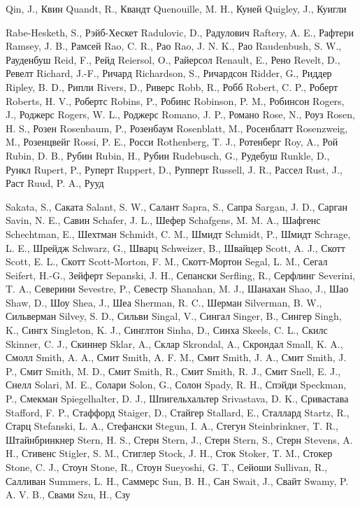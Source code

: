 Qin, J., Квин
Quandt, R., Квандт
Quenouille, M. H., Куней 
Quigley, J., Куигли

Rabe-Hesketh, S., Рэйб-Хескет
Radulovic, D., Радулович
Raftery, A. E., Рафтери
Ramsey, J. B., Рамсей
Rao, C. R., Рао
Rao, J. N. K., Рао
Raudenbush, S. W., Рауденбуш 
Reid, F., Рейд
Reiersol, O., Райерсол
Renault, E., Рено 
Revelt, D., Ревелт
Richard, J.-F., Ричард 
Richardson, S., Ричардсон 
Ridder, G., Риддер 
Ripley, B. D., Рипли 
Rivers, D., Риверс
Robb, R., Робб
Robert, C. P., Роберт
Roberts, H. V., Робертс
Robins, P., Робинс
Robinson, P. M., Робинсон 
Rogers, J., Роджерс
Rogers, W. L., Роджерс
Romano, J. P., Романо
Rose, N., Роуз
Rosen, H. S., Розен
Rosenbaum, P., Розенбаум
Rosenblatt, M., Росенблатт
Rosenzweig, M., Розенцвейг 
Rossi, P. E., Росси
Rothenberg, T. J., Ротенберг
Roy, A., Рой
Rubin, D. B., Рубин
Rubin, H., Рубин
Rudebusch, G., Рудебуш
Runkle, D., Рункл
Rupert, P., Руперт
Ruppert, D., Рупперт
Russell, J. R., Рассел
Rust, J., Раст
Ruud, P. A., Рууд

Sakata, S., Саката
Salant, S. W., Салант
Sapra, S., Сапра
Sargan, J. D., Сарган
Savin, N. E., Савин
Schafer, J. L., Шефер 
Schafgens, M. M. A., Шафгенс
Schechtman, E., Шехтман
Schmidt, C. M., Шмидт
Schmidt, P., Шмидт 
Schrage, L. E., Шрейдж
Schwarz, G., Шварц
Schweizer, B., Швайцер
Scott, A. J., Скотт
Scott, E. L., Скотт
Scott-Morton, F. M., Скотт-Мортон
Segal, L. M., Сегал
Seifert, H.-G., Зейферт
Sepanski, J. H., Сепански
Serfling, R., Серфлинг
Severini, T. A., Северини
Sevestre, P., Севестр
Shanahan, M. J., Шанахан
Shao, J., Шао
Shaw, D., Шоу
Shea, J., Шеа
Sherman, R. C., Шерман
Silverman, B. W., Сильверман
Silvey, S. D., Сильви
Singal, V., Сингал
Singer, B., Сингер
Singh, K., Сингх
Singleton, K. J., Синглтон
Sinha, D., Синха
Skeels, C. L., Скилс
Skinner, C. J., Скиннер
Sklar, A., Склар
Skrondal, A., Скрондал
Small, K. A., Смолл
Smith, A. A., Смит
Smith, A. F. M., Смит
Smith, J. A., Смит 
Smith, J. P., Смит
Smith, M. D., Смит
Smith, R., Смит
Smith, R. J., Смит
Snell, E. J., Снелл
Solari, M. E., Солари
Solon, G., Солон
Spady, R. H., Спэйди
Speckman, P., Смекман
Spiegelhalter, D. J., Шпигельхальтер
Srivastava, D. K., Сривастава
Stafford, F. P., Стаффорд
Staiger, D., Стайгер
Stallard, E., Сталлард
Startz, R., Старц
Stefanski, L. A., Стефански
Stegun, I. A., Стегун
Steinbrinkner, T. R., Штайнбринкнер
Stern, H. S., Стерн
Stern, J., Стерн
Stern, S., Стерн
Stevens, A. H., Стивенс
Stigler, S. M., Стиглер
Stock, J. H., Сток
Stoker, T. M., Стокер
Stone, C. J., Стоун
Stone, R., Стоун
Sueyoshi, G. T., Сейоши
Sullivan, R., Салливан
Summers, L. H., Саммерс
Sun, B. H., Сан
Swait, J., Свайт
Swamy, P. A. V. B., Свами
Szu, H., Сзу

